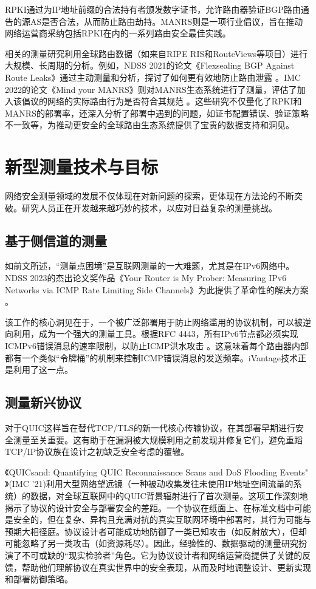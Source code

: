 \documentclass[conference]{IEEEtran}
\begin{document}
RPKI通过为IP地址前缀的合法持有者颁发数字证书，允许路由器验证BGP路由通告的源AS是否合法，从而防止路由劫持。MANRS则是一项行业倡议，旨在推动网络运营商采纳包括RPKI在内的一系列路由安全最佳实践。

相关的测量研究利用全球路由数据（如来自RIPE RIS和RouteViews等项目）进行大规模、长周期的分析。例如，NDSS 2021的论文《Flexsealing BGP Against Route Leaks》通过主动测量和分析，探讨了如何更有效地防止路由泄露 。IMC 2022的论文《Mind your MANRS》则对MANRS生态系统进行了测量，评估了加入该倡议的网络的实际路由行为是否符合其规范 。这些研究不仅量化了RPKI和MANRS的部署率，还深入分析了部署中遇到的问题，如证书配置错误、验证策略不一致等，为推动更安全的全球路由生态系统提供了宝贵的数据支持和洞见。

\section{新型测量技术与目标}

网络安全测量领域的发展不仅体现在对新问题的探索，更体现在方法论的不断突破。研究人员正在开发越来越巧妙的技术，以应对日益复杂的测量挑战。

\subsection{基于侧信道的测量}
如前文所述，“测量点困境”是互联网测量的一大难题，尤其是在IPv6网络中。NDSS 2023的杰出论文奖作品《Your Router is My Prober: Measuring IPv6 Networks via ICMP Rate Limiting Side Channels》为此提供了革命性的解决方案 。

该工作的核心洞见在于，一个被广泛部署用于防止网络滥用的协议机制，可以被逆向利用，成为一个强大的测量工具。根据RFC 4443，所有IPv6节点都必须实现ICMPv6错误消息的速率限制，以防止ICMP洪水攻击 。这意味着每个路由器内部都有一个类似“令牌桶”的机制来控制ICMP错误消息的发送频率。iVantage技术正是利用了这一点。


\subsection{测量新兴协议}
对于QUIC这样旨在替代TCP/TLS的新一代核心传输协议，在其部署早期进行安全测量至关重要。这有助于在漏洞被大规模利用之前发现并修复它们，避免重蹈TCP/IP协议族在设计之初缺乏安全考虑的覆辙。

《QUICsand: Quantifying QUIC Reconnaissance Scans and DoS Flooding Events" 》(IMC '21)利用大型网络望远镜（一种被动收集发往未使用IP地址空间流量的系统）的数据，对全球互联网中的QUIC背景辐射进行了首次测量。这项工作深刻地揭示了协议的设计安全与部署安全的差距。一个协议在纸面上、在标准文档中可能是安全的，但在复杂、异构且充满对抗的真实互联网环境中部署时，其行为可能与预期大相径庭。协议设计者可能成功地防御了一类已知攻击（如反射放大），但却可能忽略了另一类攻击（如资源耗尽）。因此，经验性的、数据驱动的测量研究扮演了不可或缺的“现实检验者”角色。它为协议设计者和网络运营商提供了关键的反馈，帮助他们理解协议在真实世界中的安全表现，从而及时地调整设计、更新实现和部署防御策略。
\end{document}
